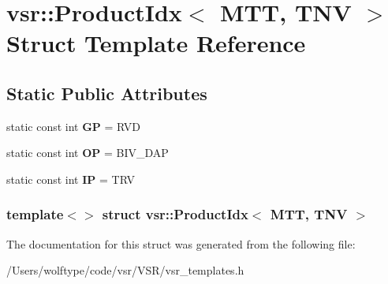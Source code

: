\hypertarget{structvsr_1_1_product_idx_3_01_m_t_t_00_01_t_n_v_01_4}{\section{vsr\-:\-:Product\-Idx$<$ M\-T\-T, T\-N\-V $>$ Struct Template Reference}
\label{structvsr_1_1_product_idx_3_01_m_t_t_00_01_t_n_v_01_4}
}
\subsection*{Static Public Attributes}
\begin{DoxyCompactItemize}
\item 
\hypertarget{structvsr_1_1_product_idx_3_01_m_t_t_00_01_t_n_v_01_4_a28c2e622bc22a1da644778c5d6264d3c}{static const int {\bfseries G\-P} = R\-V\-D}\label{structvsr_1_1_product_idx_3_01_m_t_t_00_01_t_n_v_01_4_a28c2e622bc22a1da644778c5d6264d3c}

\item 
\hypertarget{structvsr_1_1_product_idx_3_01_m_t_t_00_01_t_n_v_01_4_ad18798a4644da2cef135e7fb8d119a32}{static const int {\bfseries O\-P} = B\-I\-V\-\_\-\-D\-A\-P}\label{structvsr_1_1_product_idx_3_01_m_t_t_00_01_t_n_v_01_4_ad18798a4644da2cef135e7fb8d119a32}

\item 
\hypertarget{structvsr_1_1_product_idx_3_01_m_t_t_00_01_t_n_v_01_4_a44544a71f81881205dea888d3d0b179e}{static const int {\bfseries I\-P} = T\-R\-V}\label{structvsr_1_1_product_idx_3_01_m_t_t_00_01_t_n_v_01_4_a44544a71f81881205dea888d3d0b179e}

\end{DoxyCompactItemize}
\subsubsection*{template$<$$>$ struct vsr\-::\-Product\-Idx$<$ M\-T\-T, T\-N\-V $>$}



The documentation for this struct was generated from the following file\-:\begin{DoxyCompactItemize}
\item 
/\-Users/wolftype/code/vsr/\-V\-S\-R/vsr\-\_\-templates.\-h\end{DoxyCompactItemize}
